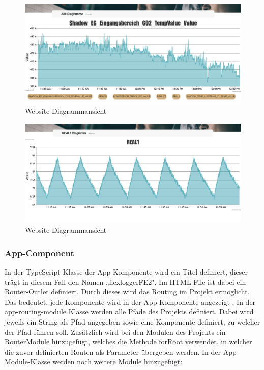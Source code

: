 \begin{figure}
\centering
\includegraphics[scale=0.35]{pics/FlexLoggerWebsiteDiagramm.jpg}
\caption{Website Diagrammansicht}
\label{fig:impl:FlexLoggerDiagrammAnsicht}
\end{figure}

\begin{figure}
    \centering
    \includegraphics[scale=0.35]{pics/FlexLoggerWebsiteDiagrammOne.jpg}
    \caption{Website Diagrammansicht}
    \label{fig:impl:FlexLoggerDiagrammAnsichtOne}
    \end{figure}


\subsubsection{App-Component}
In der TypeScript Klasse der App-Komponente wird ein Titel definiert, dieser trägt in diesem Fall den Namen „flexloggerFE2". Im HTML-File ist dabei ein Router-Outlet definiert. Durch dieses wird das Routing im Projekt ermöglicht. Das bedeutet, jede Komponente wird in der App-Komponente angezeigt %
. In der app-routing-module Klasse werden alle Pfade des Projekts definiert. Dabei wird jeweils ein String als Pfad angegeben sowie eine Komponente definiert, zu welcher der Pfad führen soll. Zusätzlich wird bei den Modulen des Projekts ein RouterModule hinzugefügt, welches die Methode forRoot verwendet, in welcher die zuvor definierten Routen als Parameter übergeben werden. In der App-Module-Klasse werden noch weitere Module hinzugefügt:


